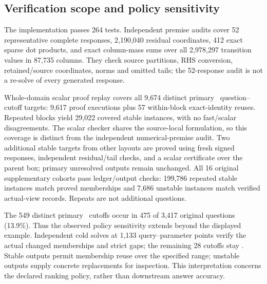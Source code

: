 \subsection{Verification scope and policy sensitivity}
The implementation passes 264 tests. Independent premise audits cover 52 representative complete responses, 2,190,040 residual coordinates, 412 exact sparse dot products, and exact column-mass sums over all 2,978,297 transition values in 87,735 columns. They check source partitions, RHS conversion, retained/source coordinates, norms and omitted tails; the 52-response audit is not a re-solve of every generated response.

Whole-domain scalar proof replay covers all 9,674 distinct primary \stable\ question--cutoff targets: 9,617 proof executions plus 57 within-block exact-identity reuses. Repeated blocks yield 29,022 covered stable instances, with no fast/scalar disagreements. The scalar checker shares the source-local formulation, so this coverage is distinct from the independent numerical-premise audit. Two additional stable targets from other layouts are proved using fresh signed responses, independent residual/tail checks, and a scalar certificate over the parent box; primary unresolved outputs remain unchanged. All 16 original supplementary cohorts pass ledger/output checks: 199,786 repeated stable instances match proved memberships and 7,686 unstable instances match verified actual-view records. Repeats are not additional questions.

The 549 distinct primary \unstable\ cutoffs occur in 475 of 3,417 original questions (13.9\%). Thus the observed policy sensitivity extends beyond the displayed example. Independent cold solves at 1,133 query--parameter points verify the actual changed memberships and strict gaps; the remaining 28 cutoffs stay \unknown. Stable outputs permit membership reuse over the specified range; unstable outputs supply concrete replacements for inspection. This interpretation concerns the declared ranking policy, rather than downstream answer accuracy.
